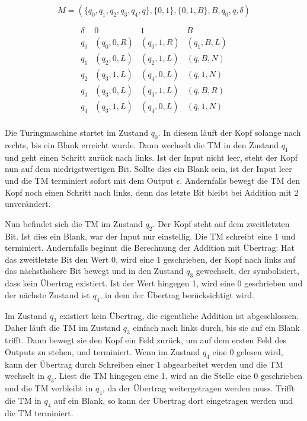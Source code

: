 \begin{exercise}{6}

\[M = (\{q_0, q_1, q_2, q_3, q_4, \bar{q}\}, \{0, 1\}, \{0, 1, B\}, B, q_0, \bar{q}, \delta)\]

\[\begin{array}{c|ccc}
\delta&0&1&B\\\hline
q_0&(q_0,0,R)&(q_0,1,R)&(q_1,B,L)\\
q_1&(q_2,0,L)&(q_2,1,L)&(\bar{q},B,N)\\
q_2&(q_3,1,L)&(q_4,0,L)&(\bar{q},1,N)\\
q_3&(q_3,0,L)&(q_3,1,L)&(\bar{q},B,R)\\
q_4&(q_3,1,L)&(q_4,0,L)&(\bar{q},1,N)\\
\end{array}\]

Die Turingmaschine startet im Zustand $q_0$. In diesem l\"auft der Kopf solange nach rechts, bis ein Blank erreicht wurde. Dann wechselt die TM in den Zustand $q_1$ und geht einen Schritt zur\"uck nach links. Ist der Input nicht leer, steht der Kopf nun auf dem niedrigstwertigen Bit. Sollte dies ein Blank sein, ist der Input leer und die TM terminiert sofort mit dem Output $\epsilon$. Andernfalls bewegt die TM den Kopf noch einen Schritt nach links, denn das letzte Bit bleibt bei Addition mit 2 unver\"andert. 

Nun befindet sich die TM im Zustand $q_2$. Der Kopf steht auf dem zweitletzten Bit. Ist dies ein Blank, war der Input nur einstellig. Die TM schreibt eine 1 und terminiert. Andernfalls beginnt die Berechnung der Addition mit \"Ubertrag: Hat das zweitletzte Bit den Wert 0, wird eine 1 geschrieben, der Kopf nach links auf das n\"achsth\"ohere Bit bewegt und in den Zustand $q_3$ gewechselt, der symbolisiert, dass kein \"Ubertrag existiert. Ist der Wert hingegen 1, wird eine 0 geschrieben und der n\"achste Zustand ist $q_4$, in dem der \"Ubertrag ber\"ucksichtigt wird.

Im Zustand $q_3$ existiert kein \"Ubertrag, die eigentliche Addition ist abgeschlossen. Daher l\"auft die TM im Zustand $q_3$ einfach nach links durch, bis sie auf ein Blank trifft. Dann bewegt sie den Kopf ein Feld zur\"uck, um auf dem ersten Feld des Outputs zu stehen, und terminiert. Wenn im Zustand $q_4$ eine 0 gelesen wird, kann der \"Ubertrag durch Schreiben einer 1 abgearbeitet werden und die TM wechselt in $q_3$. Liest die TM hingegen eine 1, wird an die Stelle eine 0 geschrieben und die TM verbleibt in $q_4$, da der \"Ubertrag weitergetragen werden muss. Trifft die TM in $q_4$ auf ein Blank, so kann der \"Ubertrag dort eingetragen werden und die TM terminiert. 

\end{exercise}